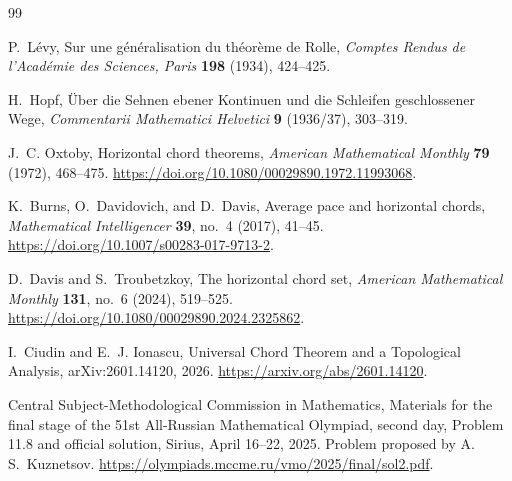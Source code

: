 \documentclass[11pt]{article}
\theoremstyle{definition}
\theoremstyle{remark}
\begin{document}
\begin{thebibliography}{99}

P.~L\'evy,
\newblock Sur une g\'en\'eralisation du th\'eor\`eme de Rolle,
\newblock \emph{Comptes Rendus de l'Acad\'emie des Sciences, Paris}
\textbf{198} (1934), 424--425.

H.~Hopf,
\newblock \"Uber die Sehnen ebener Kontinuen und die Schleifen
geschlossener Wege,
\newblock \emph{Commentarii Mathematici Helvetici} \textbf{9}
(1936/37), 303--319.

J.~C. Oxtoby,
\newblock Horizontal chord theorems,
\newblock \emph{American Mathematical Monthly} \textbf{79} (1972),
468--475.
\newblock \url{https://doi.org/10.1080/00029890.1972.11993068}.

K.~Burns, O.~Davidovich, and D.~Davis,
\newblock Average pace and horizontal chords,
\newblock \emph{Mathematical Intelligencer} \textbf{39}, no.~4
(2017), 41--45.
\newblock \url{https://doi.org/10.1007/s00283-017-9713-2}.

D.~Davis and S.~Troubetzkoy,
\newblock The horizontal chord set,
\newblock \emph{American Mathematical Monthly} \textbf{131}, no.~6
(2024), 519--525.
\newblock \url{https://doi.org/10.1080/00029890.2024.2325862}.

I.~Ciudin and E.~J. Ionascu,
\newblock Universal Chord Theorem and a Topological Analysis,
\newblock arXiv:2601.14120, 2026.
\newblock \url{https://arxiv.org/abs/2601.14120}.

Central Subject-Methodological Commission in Mathematics,
\newblock Materials for the final stage of the 51st All-Russian
Mathematical Olympiad, second day, Problem 11.8 and official solution,
\newblock Sirius, April 16--22, 2025.
\newblock Problem proposed by A.\,S.~Kuznetsov.
\newblock
\url{https://olympiads.mccme.ru/vmo/2025/final/sol2.pdf}.

\end{thebibliography}
\end{document}
